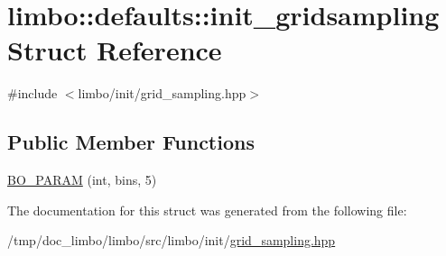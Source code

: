 \hypertarget{structlimbo_1_1defaults_1_1init__gridsampling}{}\section{limbo\+:\+:defaults\+:\+:init\+\_\+gridsampling Struct Reference}
\label{structlimbo_1_1defaults_1_1init__gridsampling}


{\ttfamily \#include $<$limbo/init/grid\+\_\+sampling.\+hpp$>$}

\subsection*{Public Member Functions}
\begin{DoxyCompactItemize}
\item 
\hyperlink{group__init__defaults_ga4f3f478d00343baf0a0d3d0f227bf9db}{B\+O\+\_\+\+P\+A\+R\+AM} (int, bins, 5)
\end{DoxyCompactItemize}


The documentation for this struct was generated from the following file\+:\begin{DoxyCompactItemize}
\item 
/tmp/doc\+\_\+limbo/limbo/src/limbo/init/\hyperlink{grid__sampling_8hpp}{grid\+\_\+sampling.\+hpp}\end{DoxyCompactItemize}
